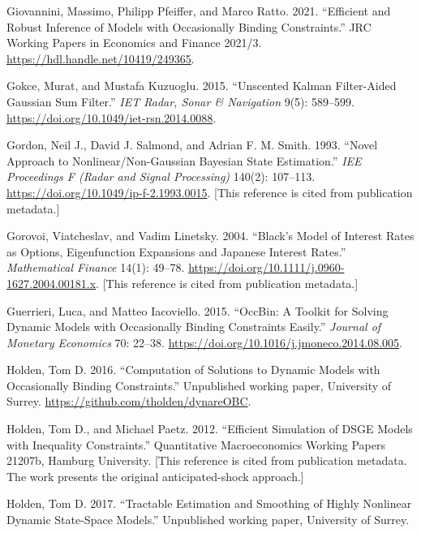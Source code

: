 \documentclass[11pt]{article}
\begin{document}
\begin{list}{}{\setlength{\leftmargin}{2em}\setlength{\itemindent}{-2em}\setlength{\itemsep}{2pt}\setlength{\parsep}{0pt}}
\item Giovannini, Massimo, Philipp Pfeiffer, and Marco Ratto. 2021. ``Efficient and Robust Inference of Models with Occasionally Binding Constraints.'' JRC Working Papers in Economics and Finance 2021/3. \url{https://hdl.handle.net/10419/249365}.

\item Gokce, Murat, and Mustafa Kuzuoglu. 2015. ``Unscented Kalman Filter-Aided Gaussian Sum Filter.'' \emph{IET Radar, Sonar \& Navigation} 9(5): 589--599. \url{https://doi.org/10.1049/iet-rsn.2014.0088}.

\item Gordon, Neil J., David J. Salmond, and Adrian F. M. Smith. 1993. ``Novel Approach to Nonlinear/Non-Gaussian Bayesian State Estimation.'' \emph{IEE Proceedings F (Radar and Signal Processing)} 140(2): 107--113. \url{https://doi.org/10.1049/ip-f-2.1993.0015}. [This reference is cited from publication metadata.]

\item Gorovoi, Viatcheslav, and Vadim Linetsky. 2004. ``Black's Model of Interest Rates as Options, Eigenfunction Expansions and Japanese Interest Rates.'' \emph{Mathematical Finance} 14(1): 49--78. \url{https://doi.org/10.1111/j.0960-1627.2004.00181.x}. [This reference is cited from publication metadata.]

\item Guerrieri, Luca, and Matteo Iacoviello. 2015. ``OccBin: A Toolkit for Solving Dynamic Models with Occasionally Binding Constraints Easily.'' \emph{Journal of Monetary Economics} 70: 22--38. \url{https://doi.org/10.1016/j.jmoneco.2014.08.005}.

\item Holden, Tom D. 2016. ``Computation of Solutions to Dynamic Models with Occasionally Binding Constraints.'' Unpublished working paper, University of Surrey. \url{https://github.com/tholden/dynareOBC}.

\item Holden, Tom D., and Michael Paetz. 2012. ``Efficient Simulation of DSGE Models with Inequality Constraints.'' Quantitative Macroeconomics Working Papers 21207b, Hamburg University. [This reference is cited from publication metadata. The work presents the original anticipated-shock approach.]

\item Holden, Tom D. 2017. ``Tractable Estimation and Smoothing of Highly Nonlinear Dynamic State-Space Models.'' Unpublished working paper, University of Surrey.


\end{list}
\end{document}
